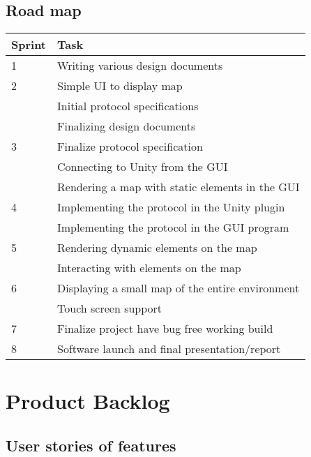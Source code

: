\documentclass[11pt]{article}
\begin{document}
    \subsection{Road map}
    \begin{tabular}{ l l }
		Sprint & Task \\
        \hline
        1 & Writing various design documents \\
        2 & Simple UI to display map \\
          & Initial protocol specifications \\
          & Finalizing design documents \\
        3 & Finalize protocol specification \\
          & Connecting to Unity from the GUI \\
          & Rendering a map with static elements in the GUI \\
        4 & Implementing the protocol in the Unity plugin \\
          & Implementing the protocol in the GUI program \\
        5 & Rendering dynamic elements on the map \\
          & Interacting with elements on the map \\
        6 & Displaying a small map of the entire environment \\
          & Touch screen support \\
        7 & Finalize project have bug free working build\\
        8 & Software launch and final presentation/report\\
	\end{tabular}
\section{Product Backlog}
	\subsection{User stories of features}
    
\end{document}
